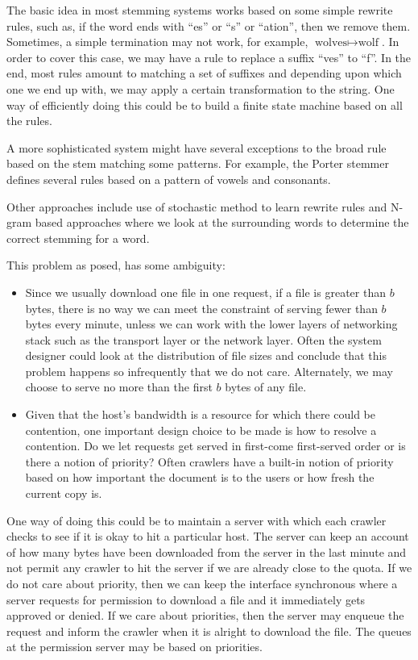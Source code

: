 The basic idea in most stemming systems works based on some simple rewrite rules, such as, if the word ends with ``es'' or ``s'' or ``ation'', then we remove
them.  Sometimes, a simple termination may not work, for example,
$\mbox{wolves} \mapsto \mbox{wolf}$. In order to cover this case, we may have a
rule to replace a suffix ``ves'' to ``f''.  In the end, most rules amount to matching a set of
suffixes and depending upon which one we end up with, we may apply a
certain transformation to the string. One way of efficiently doing this
could be to build a finite state machine based on all the rules.

A more sophisticated system might have several exceptions to the broad
rule based on the stem matching some patterns. For example, the Porter
stemmer defines several rules based on a pattern of vowels and
consonants.

Other approaches include use of stochastic method to learn rewrite
rules and N-gram based approaches where we look at the surrounding
words to determine the correct stemming for a word.

This problem as posed, has some ambiguity:
\begin{itemize}
\itemsep 1pt
\item Since we usually download one file in one request, if a file is
  greater than $b$ bytes, there is no way we can meet the constraint
  of serving fewer than $b$ bytes every minute, unless we  can work with
  the lower layers of networking stack such as the transport layer or the
  network layer. Often the system
  designer could look at the distribution of file sizes and conclude
  that this problem happens so infrequently that we do not care.
  Alternately, we may choose to serve no more than the first $b$ bytes of any file.

\item Given that the host's bandwidth is a resource for which there could be
contention, one important design choice to be made is how to resolve a contention. Do we let requests get served in first-come first-served order or is there a notion of priority? Often
crawlers have a built-in notion of priority based on how important the
document is to the users or how fresh the current copy is.
\end{itemize}

One way of doing this could be to maintain a server with which each
crawler checks to see if it is okay to hit a particular host. The server
can keep an account of how many bytes have been downloaded from the
server in the last minute and not permit any crawler to hit the server if
we are already close to the quota. If we do not care about priority,
then we can keep the interface synchronous where a server requests for
permission to download a file and it immediately gets approved
or denied. If we care about priorities, then the server may enqueue the
request and inform the crawler when it is alright to download the
file. The queues at the permission server may be based on priorities.

